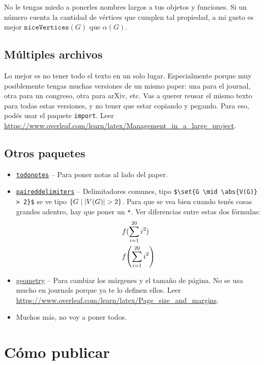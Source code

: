 \documentclass{article}
\begin{document}
No le tengas miedo a ponerles nombres largos a tus objetos y funciones. Si un número cuenta la cantidad de vértices que cumplen tal propiedad, a mi gusto es mejor $\mathtt{niceVertices}(G)$ que $\alpha(G)$.

\subsection{Múltiples archivos}
Lo mejor es no tener todo el texto en un solo lugar. Especialmente porque muy posiblemente tengas muchas versiones de un mismo paper: una para el journal, otra para un congreso, otra para arXiv, etc. Vas a querer reusar el mismo texto para todas estas versiones, y no tener que estar copiando y pegando. Para eso, podés usar el paquete \texttt{import}. Leer \url{https://www.overleaf.com/learn/latex/Management_in_a_large_project}.

\subsection{Otros paquetes}
\begin{itemize}
    \item\href{https://tug.ctan.org/macros/latex/contrib/todonotes/todonotes.pdf}{\texttt{todonotes}} -- Para poner notas al lado del paper.
    \item\href{https://github.com/ericbrandwein/latex-packages/tree/main/paireddelimiters}{\texttt{paireddelimiters}} -- Delimitadores comunes, tipo \verb|$\set{G \mid \abs{V(G)} > 2}$| se ve tipo $\{G \mid \lvert V(G)\rvert > 2\}$. Para que se vea bien cuando tenés cosas grandes adentro, hay que poner un \texttt{*}. Ver diferencias entre estas dos fórmulas:
    \begin{align*}
        &f\parens{\sum_{i = 1}^{20} i^2}\\
        &f\parens*{\sum_{i = 1}^{20} i^2}
    \end{align*}
    \item\href{https://texdoc.org/serve/geometry.pdf/0}{geometry} -- Para cambiar los márgenes y el tamaño de página. No se usa mucho en journals porque ya te lo definen ellos. Leer \url{https://www.overleaf.com/learn/latex/Page_size_and_margins}.
    \item Muchos más, no voy a poner todos.
\end{itemize}


\section{Cómo publicar}
\label{sec:publicar}
\end{document}
